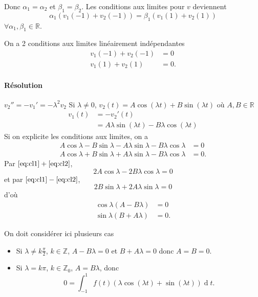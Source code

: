 \documentclass[fontsize=12pt]{article}
\DeclareMathOperator{\newdiff}{d} %
\newcommand{\dif}{\newdiff\!}
\begin{document}
\begin{enumerate}
    Donc $\alpha_1 = \alpha_2$ et $\beta_1 = \beta_2$.
    Les conditions aux limites pour $v$ deviennent
    \[\alpha_1(v_1(-1) + v_2(-1)) = \beta_1(v_1(1) + v_2(1))\]
    $\forall \alpha_1,\beta_1 \in\mathbb{R}$.

    On a 2 conditions aux limites linéairement indépendantes
    \begin{align*}
      v_1(-1) + v_2(-1) & = 0\\
      v_1(1) + v_2(1) & = 0.
    \end{align*}

    \paragraph{Résolution}
    $v_2'' = -v_1' = -\lambda^2 v_2$
    Si $\lambda \neq 0$,
    $v_2(t) = A \cos(\lambda t) + B\sin(\lambda t)$ où $A, B \in \mathbb{R}$
    \begin{align*}
      v_1(t) & = -v_2'(t)\\
      & = A\lambda\sin(\lambda t) - B\lambda\cos(\lambda t)
    \end{align*}
    Si on explicite les conditions aux limites, on a
    \begin{align}
      \label{eq:cl1}
      A \cos\lambda - B \sin\lambda - A\lambda \sin\lambda - B\lambda\cos\lambda & = 0\\
      \label{eq:cl2}
      A \cos\lambda + B \sin\lambda + A\lambda \sin\lambda - B\lambda\cos\lambda & = 0.
    \end{align}
    Par $\eqref{eq:cl1} + \eqref{eq:cl2}$,
    \[ 2A\cos\lambda - 2B\lambda\cos\lambda = 0 \]
    et par $\eqref{eq:cl1} - \eqref{eq:cl2}$,
    \[ 2B\sin\lambda + 2A\lambda\sin\lambda = 0 \]
    d'où
    \begin{align*}
      \cos\lambda (A - B\lambda) & = 0\\
      \sin\lambda (B + A\lambda) & = 0.
    \end{align*}

    On doit considérer ici plusieurs cas
    \begin{itemize}
      \item Si $\lambda \neq k\frac{\pi}{2}$, $k \in \mathbb{Z}$,
        $A - B\lambda = 0$ et $B + A\lambda = 0$ donc $A = B = 0$.

      \item Si $\lambda = k\pi$, $k \in \mathbb{Z}_0$, $A = B\lambda$,
        donc
        \[ 0 = \int_{-1}^1 f(t) (\lambda \cos(\lambda t) + \sin(\lambda t)) \dif t. \]


\end{itemize}
\end{enumerate}
\end{document}
